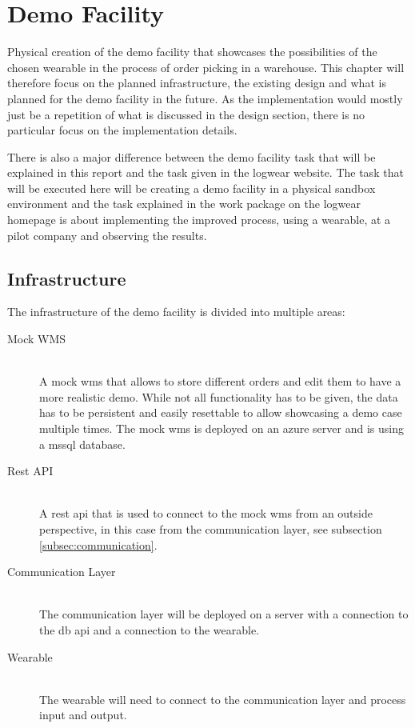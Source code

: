 \chapter{Demo Facility}\label{cha:demoFacility}
Physical creation of the demo facility that showcases the possibilities of the chosen wearable in the process of order picking in a warehouse. This chapter will therefore focus on the planned infrastructure, the existing design and what is planned for the demo facility in the future. As the implementation would mostly just be a repetition of what is discussed in the design section, there is no particular focus on the implementation details.

There is also a major difference between the demo facility task that will be explained in this report and the task given in the logwear website. \citep{website:logwear} The task that will be executed here will be creating a demo facility in a physical \gls{sandbox} environment and the task explained in the work package on the logwear homepage is about implementing the improved process, using a wearable, at a pilot company and observing the results.

\section{Infrastructure}
The infrastructure of the demo facility is divided into multiple areas:
\begin{description}
	\item[Mock WMS] \hfill \\
		A mock \gls{wms} that allows to store different orders and edit them to have a more realistic demo. While not all functionality has to be given, the data has to be persistent and easily resettable to allow showcasing a demo case multiple times. The mock \gls{wms} is deployed on an azure server and is using a \gls{mssql} database.
	\item[Rest API] \hfill \\
		A \gls{rest} \gls{api} that is used to connect to the mock \gls{wms} from an outside perspective, in this case from the communication layer, see subsection \ref{subsec:communication}.
	\item[Communication Layer] \hfill \\
		The communication layer will be deployed on a server with a connection to the \gls{db} \gls{api} and a connection to the wearable.
	\item[Wearable] \hfill \\
		The wearable will need to connect to the communication layer and process input and output.
\end{description}

